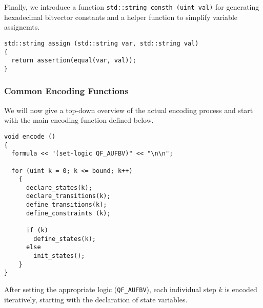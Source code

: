 \noindent
Finally, we introduce a function \lstinline[style=c++]{std::string consth (uint val)} for generating hexadecimal bitvector constants and a helper function to simplify variable assignemts.

%
%

\begin{lstlisting}[style=c++]
std::string assign (std::string var, std::string val)
{
  return assertion(equal(var, val));
}
\end{lstlisting}

\newpage
\subsubsection{Common Encoding Functions}

We will now give a top-down overview of the actual encoding process and start with the main encoding function defined below.


\begin{lstlisting}[style=c++]
void encode ()
{
  formula << "(set-logic QF_AUFBV)" << "\n\n";

  for (uint k = 0; k <= bound; k++)
    {
      declare_states(k);
      declare_transitions(k);
      define_transitions(k);
      define_constraints (k);

      if (k)
        define_states(k);
      else
        init_states();
    }
}
\end{lstlisting}

\noindent
After setting the appropriate logic (\lstinline[language=SMTLib]{QF_AUFBV}), each individual step $k$ is encoded iteratively, starting with the declaration of state variables.


